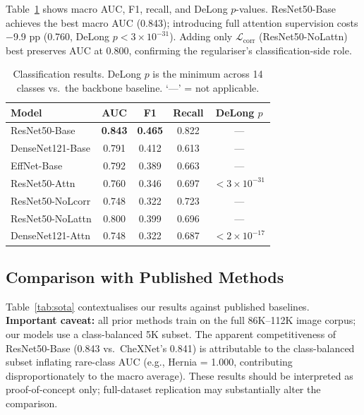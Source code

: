 \documentclass[10pt,twocolumn,letterpaper]{article}
\begin{document}
Table~\ref{tab:classification} shows macro AUC, F1, recall, and DeLong $p$-values.
ResNet50-Base achieves the best macro AUC (0.843); introducing full attention
supervision costs $-$9.9 pp (0.760, DeLong $p\!<\!3\!\times\!10^{-31}$). Adding
only $\mathcal{L}_{\text{corr}}$ (ResNet50-NoLattn) best preserves AUC at 0.800,
confirming the regulariser's classification-side role.

\begin{table}[t]
\centering
\caption{Classification results. DeLong $p$ is the minimum across 14 classes vs.\
  the backbone baseline. `---' = not applicable.}
\label{tab:classification}
\setlength{\tabcolsep}{3pt}
{\small
\begin{tabular}{lcccc}
\toprule
\textbf{Model} & \textbf{AUC} & \textbf{F1} & \textbf{Recall} & \textbf{DeLong $p$}\\
\midrule
ResNet50-Base    & \textbf{0.843} & \textbf{0.465} & 0.822 & ---\\
DenseNet121-Base & 0.791 & 0.412 & 0.613 & ---\\
EffNet-Base      & 0.792 & 0.389 & 0.663 & ---\\
\midrule
ResNet50-Attn    & 0.760 & 0.346 & 0.697 & $<3{\times}10^{-31}$\\
ResNet50-NoLcorr & 0.748 & 0.322 & 0.723 & ---\\
ResNet50-NoLattn & 0.800 & 0.399 & 0.696 & ---\\
DenseNet121-Attn & 0.748 & 0.322 & 0.687 & $<2{\times}10^{-17}$\\
\bottomrule
\end{tabular}}
\end{table}

\subsection{Comparison with Published Methods}

Table~\ref{tab:sota} contextualises our results against published baselines.
\textbf{Important caveat:} all prior methods train on the full 86K--112K image
corpus; our models use a class-balanced 5K subset. The apparent competitiveness of
ResNet50-Base (0.843 vs.\ CheXNet's 0.841) is attributable to the class-balanced
subset inflating rare-class AUC (e.g., Hernia = 1.000, contributing disproportionately
to the macro average). These results should be interpreted as proof-of-concept only;
full-dataset replication may substantially alter the comparison.
\end{document}
